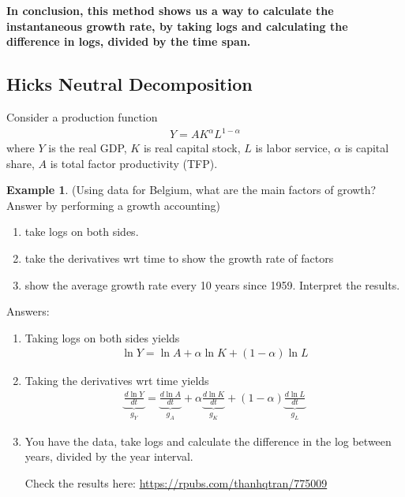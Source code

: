 \documentclass[10pt,a4paper]{book}
\theoremstyle{definition}\newtheorem{definition}{Definition}
\theoremstyle{definition}\newtheorem{fact}{Fact}
\theoremstyle{definition}\newtheorem{ex}{Ex.}
\theoremstyle{definition}\newtheorem{project}{Project}
\theoremstyle{definition}\newtheorem{problem}{Problem}
\theoremstyle{definition}\newtheorem{example}{Example}
\numberwithin{theorem}{chapter}
\numberwithin{corollary}{chapter}
\numberwithin{assumption}{chapter}
\numberwithin{definition}{chapter}
\numberwithin{prop}{chapter}
\numberwithin{notation}{chapter}
\numberwithin{problem}{chapter}
\numberwithin{example}{chapter}
\numberwithin{fact}{chapter}
\numberwithin{ex}{chapter}
\begin{document}
	\textbf{In conclusion, this method shows us a way to calculate the instantaneous growth rate, by taking logs and calculating the difference in logs, divided by the time span. }
	
	\subsection*{Hicks Neutral Decomposition}
	Consider a production function
	\begin{align*}
		Y = A K^\alpha L^{1-\alpha} 
	\end{align*}
	where $Y$ is the real GDP, $K$ is real capital stock, $L$ is labor service, $\alpha$ is capital share, $A$ is total factor productivity (TFP). 
	
	\begin{example}(Using data for Belgium, what are the main factors of growth? Answer by performing a growth accounting)
		\begin{enumerate}
			\item take logs on both sides.
			\item take the derivatives wrt time to show the growth rate of factors
			\item show the average growth rate every 10 years since 1959. Interpret the results.
		\end{enumerate}
	\end{example}
	
	Answers:
	\begin{enumerate}
		\item Taking logs on both sides yields
		\begin{align*}
			\ln Y = \ln A + \alpha \ln K + (1-\alpha) \ln L 
		\end{align*}
		\item Taking the derivatives wrt time yields
		\begin{align*}
			\underbrace{\frac{d \ln Y}{dt}}_{g_Y} = \underbrace{\frac{d\ln A}{dt}}_{g_A} + \alpha \underbrace{\frac{d\ln K}{dt}}_{g_K} + (1-\alpha) \underbrace{\frac{d\ln L}{dt}}_{g_L} 
		\end{align*}
		\item You have the data, take logs and calculate the difference in the log between years, divided by the year interval. 
		
		Check the results here:
		\href{https://rpubs.com/thanhqtran/775009}{https://rpubs.com/thanhqtran/775009}
	\end{enumerate}
	
\end{document}
